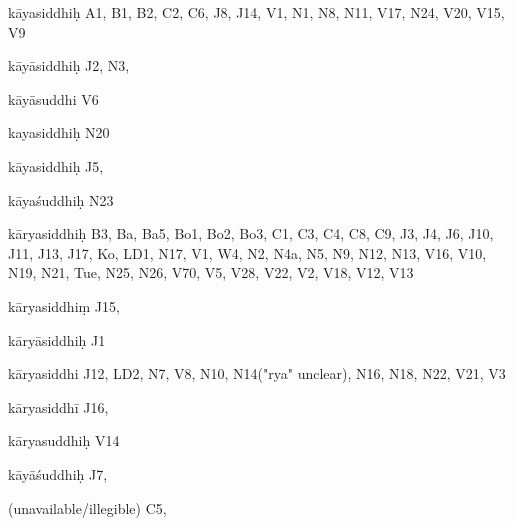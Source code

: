 \begin{ekdosis}
\begin{marma}[hp01_055]
\begin{marma}[hp02_003]
\begin{description}
        \end{description}
\end{marma}



\begin{marma}[hp02_004]
\item[kāyasiddhiḥ] A1, B1, B2, C2, C6, J8, J14, V1, N1, N8, N11, V17, N24, V20, V15, V9
\item[kāyāsiddhiḥ] J2, N3,
\item[kāyāsuddhi] V6
\item[kayasiddhiḥ] N20
\item[kāyasiddhiḥ] J5,
\item[kāyaśuddhiḥ] N23
\item[kāryasiddhiḥ] B3, Ba, Ba5, Bo1, Bo2, Bo3, C1, C3, C4, C8, C9, J3, J4, J6, J10, J11, J13, J17, Ko, LD1, N17, V1, W4, N2, N4a, N5, N9, N12, N13, V16, V10, N19, N21, Tue, N25, N26, V70, V5, V28, V22, V2, V18, V12, V13
\item[kāryasiddhiṃ] J15, 
\item[kāryāsiddhiḥ] J1
\item[kāryasiddhi] J12, LD2, N7, V8, N10, N14("rya" unclear), N16, N18, N22, V21, V3 
\item[kāryasiddhī] J16,
\item[kāryasuddhiḥ] V14
\item[kāyāśuddhiḥ] J7,
\item[(unavailable/illegible)] C5,

 \begin{description}

        \end{description}
\end{marma}



\end{marma}
\end{ekdosis}
